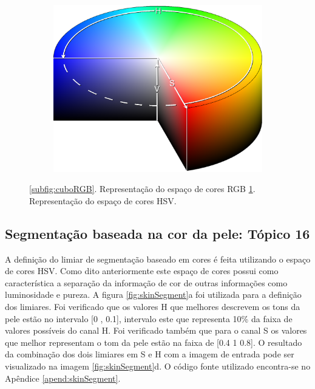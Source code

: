\documentclass[
	article,			%
	11pt,				%
	oneside,			%
	a4paper,			%
	english,			%
	brazil,				%
	sumario=tradicional
	]{abntex2}
\begin{document}
\begin{figure}
\begin{subfigure}[b]{0.3\textwidth}
        \end{subfigure}%
        ~ %
        \begin{subfigure}[b]{0.3\textwidth}
                \includegraphics[width=\textwidth,scale=1]{imagens/ex4/HSVColorSpace.png}
                \caption{}
                \label{subfig:cilindoHSV}
        \end{subfigure}
        
        \caption{ 
        \ref{subfig:cuboRGB}. Representação do espaço de cores RGB
        \ref{subfig:cilindoHSV}. Representação do espaço de cores HSV.
        } 
	\label{fig:filtrosFrequencia}
\end{figure}

\subsection{Segmentação baseada na cor da pele: Tópico 16}
A definição do limiar de segmentação baseado em cores é feita utilizando o
espaço de cores HSV. Como dito anteriormente este espaço de cores possui como
característica a separação da informação de cor de outras informações como
luminosidade e pureza. A figura \ref{fig:skinSegment}a foi utilizada para a
definição dos limiares. Foi verificado que os valores H que melhores descrevem
os tons da pele estão no intervalo [0 , 0.1], intervalo este que representa
10\% da faixa de valores possíveis do canal H. Foi verificado também que para o
canal S os valores que melhor representam o tom da pele estão na faixa de [0.4
1 0.8]. O resultado da combinação dos dois limiares em S e H com a imagem de
entrada pode ser visualizado na imagem \ref{fig:skinSegment}d.  O código
fonte utilizado encontra-se no Apêndice \ref{apend:skinSegment}.
\end{document}
